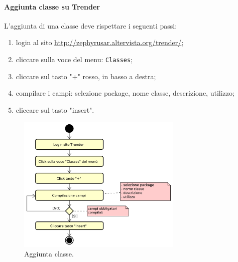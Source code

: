 		\paragraph{Aggiunta classe su Trender}
		L'aggiunta di una classe deve rispettare i seguenti passi:
		\begin{enumerate}
			\item login al sito \url{http://zephyrusar.altervista.org/trender/};
			\item cliccare sulla voce del menu: \texttt{Classes};
			\item cliccare sul tasto "+" rosso, in basso a destra;
			\item compilare i campi: selezione package, nome classe, descrizione, utilizzo;
			\item cliccare sul tasto "insert".
		\end{enumerate}
		\begin{figure}[H]
			\centering
			\includegraphics[width=0.7\textwidth]{img/AggiuntaClasse}
			\caption{Aggiunta classe.}
		\end{figure}
		
